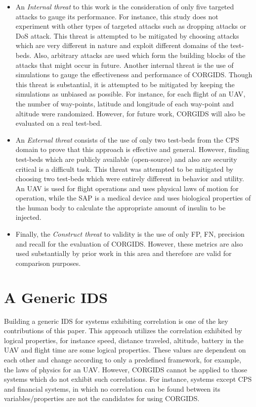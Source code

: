 \begin{itemize}
\item An \textit{Internal threat} to this work is the consideration of only five targeted attacks to gauge its performance. For instance, this study does not experiment with other types of targeted attacks such as dropping attacks or \ac{DoS} attack. This threat is attempted to be mitigated by choosing attacks which are very different in nature and exploit different domains of the test-beds. Also, arbitrary attacks are used which form the building blocks of the attacks that might occur in future. Another internal threat is the use of simulations to gauge the effectiveness and performance of \ac{CORGIDS}. Though this threat is substantial, it is attempted to be mitigated by keeping the simulations as unbiased as possible. For instance, for each flight of an \ac{UAV}, the number of way-points, latitude and longitude of each way-point and altitude were randomized. However, for future work, \ac{CORGIDS} will also be evaluated on a real test-bed. 

\item An \textit{External threat} consists of the use of only two test-beds from the \ac{CPS} domain to prove that this approach is effective and general. However, finding test-beds which are publicly available (open-source) and also are security critical is a difficult task. This threat was attempted to be mitigated by choosing two test-beds which were entirely different in behavior and utility. An \ac{UAV} is used for flight operations and uses physical laws of motion for operation, while the SAP is a medical device and uses biological properties of the human body to calculate the appropriate amount of insulin to be injected. 

\item Finally, the \textit{Construct  threat} to validity is the use of only \ac{FP}, \ac{FN}, precision and recall for the evaluation of \ac{CORGIDS}. However, these metrics are also used substantially by prior work in this area and therefore are valid for comparison purposes. 
\end{itemize}

\section{A Generic IDS}
Building a generic \ac{IDS} for systems exhibiting correlation is one of the key contributions of this paper. This approach utilizes the correlation exhibited by logical properties, for instance speed, distance traveled, altitude, battery in the \ac{UAV} and flight time are some logical properties. These values are dependent on each other and change according to only a predefined framework, for example, the laws of physics for an \ac{UAV}. However, \ac{CORGIDS} cannot be applied to those systems which do not exhibit such correlations. For instance, systems except \ac{CPS} and financial systems, in which no correlation can be found between its variables/properties are not the candidates for using \ac{CORGIDS}.

